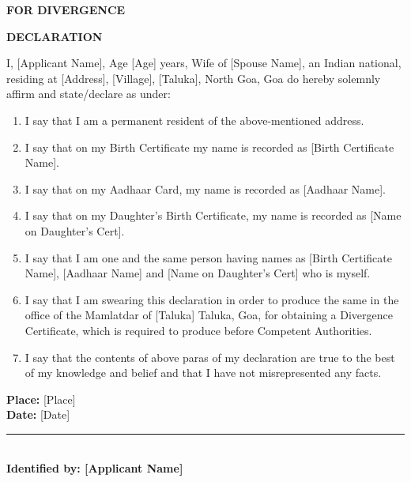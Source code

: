 \documentclass[11pt, a4paper]{article}
\begin{document}
\noindent
\begin{minipage}[c]{0.33\textwidth}
\end{minipage}%
\begin{minipage}[c]{0.34\textwidth}
    \centering
    \textbf{\Large FOR DIVERGENCE}
\end{minipage}%
\begin{center}
    \textbf{\Large DECLARATION}
\end{center}
\begin{minipage}[c]{0.33\textwidth}
\end{minipage}

\vspace{0.8cm} %

I, [Applicant Name], Age [Age] years, Wife of [Spouse Name], an Indian national, residing at [Address], [Village], [Taluka], North Goa, Goa do hereby solemnly affirm and state/declare as under:

\begin{enumerate}
    \item I say that I am a permanent resident of the above-mentioned address.
    \item I say that on my Birth Certificate my name is recorded as [Birth Certificate Name].
    \item I say that on my Aadhaar Card, my name is recorded as [Aadhaar Name].
    \item I say that on my Daughter's Birth Certificate, my name is recorded as [Name on Daughter's Cert].
    \item I say that I am one and the same person having names as [Birth Certificate Name], [Aadhaar Name] and [Name on Daughter's Cert] who is myself.
    \item I say that I am swearing this declaration in order to produce the same in the office of the Mamlatdar of [Taluka] Taluka, Goa, for obtaining a Divergence Certificate, which is required to produce before Competent Authorities.
    \item I say that the contents of above paras of my declaration are true to the best of my knowledge and belief and that I have not misrepresented any facts.
\end{enumerate}

\vspace{0.5cm}
\noindent \textbf{Place:} [Place] \\
\textbf{Date:} [Date]

\vspace{1cm}
\begin{flushleft}
    \vspace{0.2cm}
    \rule{5cm}{0.4pt} \\
    \textbf{Identified by: [Applicant Name]}
\end{flushleft}
\end{document}
